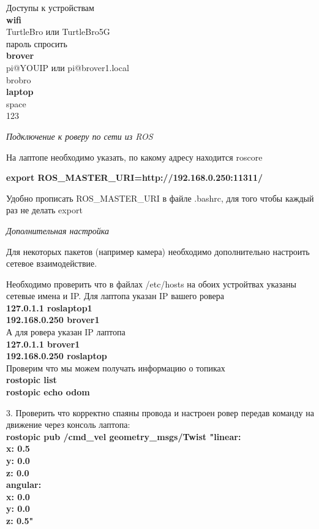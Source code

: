 Доступы к устройствам\\
\textbf{wifi}\\
TurtleBro или TurtleBro5G\\
пароль спросить\\
\textbf{brover}\\
pi@YOUIP или pi@brover1.local\\
brobro\\
\textbf{laptop}\\
space\\
123

\textit{Подключение к роверу по сети из ROS}

На лаптопе необходимо указать, по какому адресу находится roscore

\textbf{export ROS\_MASTER\_URI=http://192.168.0.250:11311/}

Удобно прописать ROS\_MASTER\_URI в файле .bashrc, для того чтобы каждый раз не делать export

\textit{Дополнительная настройка}

Для некоторых пакетов (например камера) необходимо дополнительно настроить сетевое взаимодействие.

Необходимо проверить что в файлах /etc/hosts на обоих устройтвах указаны сетевые имена и IP. Для лаптопа указан IP вашего ровера\\
\textbf{127.0.1.1	roslaptop1}\\
\textbf{192.168.0.250	brover1}\\
А для ровера указан IP лаптопа\\
\textbf{127.0.1.1	brover1}\\
\textbf{192.168.0.250	roslaptop}\\
Проверим что мы можем получать информацию о топиках\\
\textbf{rostopic list}\\
\textbf{rostopic echo odom}

3.  Проверить что корректно спаяны провода и настроен ровер передав команду на движение через консоль лаптопа:\\
\textbf{rostopic pub /cmd\_vel geometry\_msgs/Twist "linear:}\\
\textbf{  x: 0.5}\\
\textbf{  y: 0.0}\\
\textbf{  z: 0.0}\\
\textbf{angular:}\\
\textbf{  x: 0.0}\\
\textbf{  y: 0.0}\\
\textbf{  z: 0.5"}

